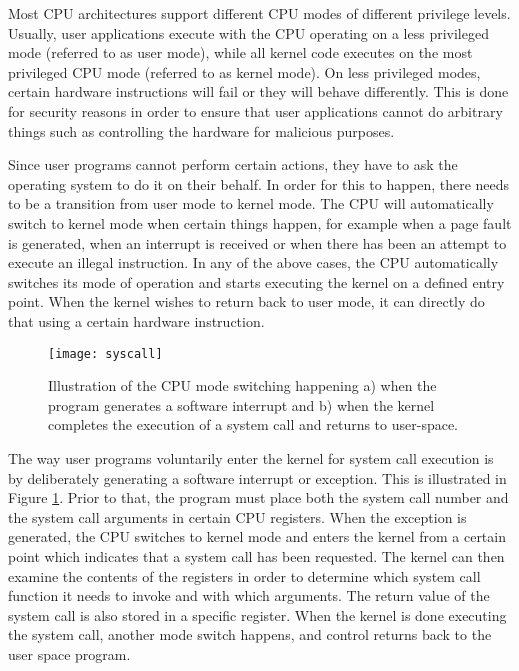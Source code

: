 Most CPU architectures support different CPU modes of different privilege
levels. Usually, user applications execute with the CPU operating on a less
privileged mode (referred to as user mode), while all kernel code executes on
the most privileged CPU mode (referred to as kernel mode). On less privileged
modes, certain hardware instructions will fail or they will behave differently.
This is done for security reasons in order to ensure that user applications
cannot do arbitrary things such as controlling the hardware for malicious
purposes.

Since user programs cannot perform certain actions, they have to ask the
operating system to do it on their behalf. In order for this to happen, there
needs to be a transition from user mode to kernel mode. The CPU will
automatically switch to kernel mode when certain things happen, for example
when a page fault is generated, when an interrupt is received or when there has
been an attempt to execute an illegal instruction. In any of the above cases,
the CPU automatically switches its mode of operation and starts executing the
kernel on a defined entry point. When the kernel wishes to return back to user
mode, it can directly do that using a certain hardware instruction.

\begin{figure}[h]
\centering
\texttt{[image: syscall]}
  \caption{Illustration of the CPU mode switching happening a) when the program
  generates a software interrupt and b) when the kernel completes the execution
  of a system call and returns to user-space. }
\label{fig:syscall}
\end{figure}

The way user programs voluntarily enter the kernel for system call execution is
by deliberately generating a software interrupt or exception. This is
illustrated in Figure \ref{fig:syscall}. Prior to that, the program must place
both the system call number and the system call arguments in certain CPU
registers. When the exception is generated, the CPU switches to kernel mode and
enters the kernel from a certain point which indicates that a system call has
been requested. The kernel can then examine the contents of the registers in
order to determine which system call function it needs to invoke and with which
arguments. The return value of the system call is also stored in a specific
register. When the kernel is done executing the system call, another mode
switch happens, and control returns back to the user space program.


